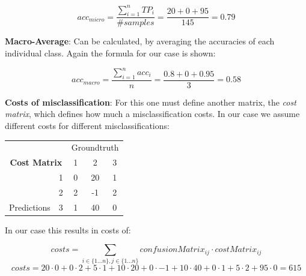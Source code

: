 \documentclass[12pt,a4paper]{article}
\begin{document}
\[acc_{micro} = \frac{\sum_{i=1}^{n} TP_i}{\#samples} = \frac{20 + 0 + 95}{145} = 0.79\]

\noindent \textbf{Macro-Average}: Can be calculated, by averaging the accuracies of each individual class. Again the formula for our case is shown:

\[acc_{macro} = \frac{\sum_{i=1}^{n} acc_i}{n} = \frac{0.8 + 0 + 0.95}{3} = 0.58\]

\noindent \textbf{Costs of misclassification}: For this one must define another matrix, the \textit{cost matrix}, which defines how much a misclassification costs. In our case we assume different costs for different misclassifications:

\begin{table}[h]
\begin{tabular}{|cc|ccc|}
\hline
\multicolumn{2}{|c|}{}                                       & \multicolumn{3}{c|}{Groundtruth}                                                                                             \\ \cline{3-5}
\multicolumn{2}{|c|}{\multirow{-2}{*}{\textbf{Cost Matrix}}} & \multicolumn{1}{c|}{1}                         & \multicolumn{1}{c|}{2}                          & 3                         \\ \hline
\multicolumn{1}{|c|}{}                                 & 1   & \multicolumn{1}{c|}{\cellcolor[HTML]{95C884}0} & \multicolumn{1}{c|}{\cellcolor[HTML]{E49696}20} & \cellcolor[HTML]{E49696}1 \\ \cline{2-5}
\multicolumn{1}{|c|}{}                                 & 2   & \multicolumn{1}{c|}{\cellcolor[HTML]{E49696}2} & \multicolumn{1}{c|}{\cellcolor[HTML]{95C884}-1} & \cellcolor[HTML]{E49696}2 \\ \cline{2-5}
\multicolumn{1}{|c|}{\multirow{-3}{*}{Predictions}}    & 3   & \multicolumn{1}{c|}{\cellcolor[HTML]{E49696}1} & \multicolumn{1}{c|}{\cellcolor[HTML]{E49696}40} & \cellcolor[HTML]{95C884}0 \\ \hline
\end{tabular}
\end{table}

\noindent In our case this results in costs of:

\[costs = \sum_{i \in \{1...n\}, j \in \{1...n\}} confusionMatrix_{ij} \cdot costMatrix_{ij} \]
\[costs = 20 \cdot 0 + 0 \cdot 2 + 5 \cdot 1 + 10 \cdot 20 + 0 \cdot -1 + 10 \cdot 40 + 0 \cdot 1 + 5 \cdot 2 + 95 \cdot 0 = 615 \]
\end{document}
